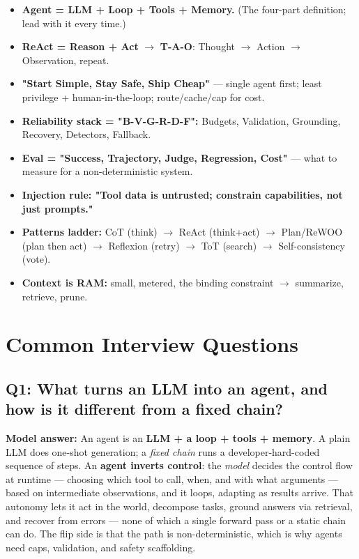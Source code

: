\documentclass[11pt]{article}
\providecommand{\tightlist}{\setlength{\itemsep}{1pt}\setlength{\parskip}{0pt}}
\begin{document}
\begin{itemize}
\tightlist
\item
  \textbf{Agent = LLM + Loop + Tools + Memory.} (The four-part definition; lead with it every time.)
\item
  \textbf{ReAct = Reason + Act} \(\rightarrow\) \textbf{T-A-O}: Thought \(\rightarrow\) Action \(\rightarrow\) Observation, repeat.
\item
  \textbf{"Start Simple, Stay Safe, Ship Cheap"} --- single agent first; least privilege + human-in-the-loop; route/cache/cap for cost.
\item
  \textbf{Reliability stack = "B-V-G-R-D-F":} Budgets, Validation, Grounding, Recovery, Detectors, Fallback.
\item
  \textbf{Eval = "Success, Trajectory, Judge, Regression, Cost"} --- what to measure for a non-deterministic system.
\item
  \textbf{Injection rule: "Tool data is untrusted; constrain capabilities, not just prompts."}
\item
  \textbf{Patterns ladder:} CoT (think) \(\rightarrow\) ReAct (think+act) \(\rightarrow\) Plan/ReWOO (plan then act) \(\rightarrow\) Reflexion (retry) \(\rightarrow\) ToT (search) \(\rightarrow\) Self-consistency (vote).
\item
  \textbf{Context is RAM:} small, metered, the binding constraint \(\rightarrow\) summarize, retrieve, prune.
\end{itemize}

\section{Common Interview Questions}\label{common-interview-questions}

\subsection{Q1: What turns an LLM into an agent, and how is it different from a fixed chain?}\label{q1-what-turns-an-llm-into-an-agent-and-how-is-it-different-from-a-fixed-chain}

\textbf{Model answer:} An agent is an \textbf{LLM + a loop + tools + memory}. A plain LLM does one-shot generation; a \emph{fixed chain} runs a developer-hard-coded sequence of steps. An \textbf{agent inverts control}: the \emph{model} decides the control flow at runtime --- choosing which tool to call, when, and with what arguments --- based on intermediate observations, and it loops, adapting as results arrive. That autonomy lets it act in the world, decompose tasks, ground answers via retrieval, and recover from errors --- none of which a single forward pass or a static chain can do. The flip side is that the path is non-deterministic, which is why agents need caps, validation, and safety scaffolding.
\end{document}
